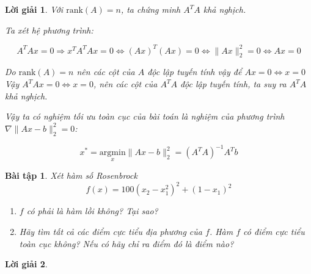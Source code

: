 \documentclass[14pt, a4paper]{article}
\theoremstyle{sltheorem}
\newtheorem{baitap}{Bài tập}
\theoremstyle{soltheorem}
\newtheorem*{loigiai}{Lời giải}
\begin{document}
\begin{loigiai}
        Với $\mathrm{rank}(A)=n$, ta chứng minh $A^T A$ khả nghịch.

        Ta xét hệ phương trình:

        \begin{equation*}
            A^T A x = 0 \Rightarrow x^T A^T A x = 0 \Leftrightarrow (Ax)^T (Ax) = 0 \Leftrightarrow \lVert Ax \rVert_2^2 =0 \Leftrightarrow Ax = 0
        \end{equation*}

        Do $\mathrm{rank}(A)=n$ nên các cột của $A$ độc lập tuyến tính vậy để $Ax=0 \Leftrightarrow x = 0$
        Vậy $A^T A x = 0 \Leftrightarrow x = 0$, nên các cột của $A^T A$ độc lập tuyến tính, ta suy ra $A^T A$ khả nghịch.

        Vậy ta có nghiệm tối ưu toàn cục của bài toán là nghiệm của phương trình $\nabla \lVert Ax - b \rVert_2^2=0$:

        \begin{equation*}
            x^* = \underset{x}{\mathrm{argmin}}\lVert Ax - b \rVert_2^2=(A^TA)^{-1}A^T b
        \end{equation*}
    \end{loigiai}

    \begin{baitap}
        Xét hàm số Rosenbrock
        \begin{equation*}
            f(x)=100(x_2 - x_1^2)^2 + (1-x_1)^2
        \end{equation*}
        \begin{enumerate}[wide, labelwidth=!, labelindent=0pt,label=\textbf{\arabic*}.]
            \item $f$ có phải là hàm lồi không? Tại sao?
            \item Hãy tìm tất cả các điểm cực tiểu địa phương của $f$. Hàm $f$ có điểm cực tiểu toàn cục không? Nếu có hãy chỉ ra điểm đó là điểm nào?
        \end{enumerate}
    \end{baitap}

    \begin{loigiai}

    \end{loigiai}

    \newpage
    \printbibliography[title={TÀI LIỆU THAM KHẢO}]
\end{document}
